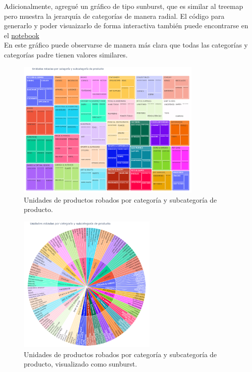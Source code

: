 Adicionalmente, agregué un gráfico de tipo sunburst, que es similar al treemap pero muestra la jerarquía de categorías de manera radial. El código para generarlo y poder visuaizarlo de forma interactiva también puede encontrarse en el \href{https://github.com/patricioibar/datos-tp1/blob/main/consultas_propias.ipynb}{notebook} \\
En este gráfico puede observarse de manera más clara que todas las categorías y categorías padre tienen valores similares.

\begin{figure}[H]
    \centering
    \includegraphics[width=0.8\textwidth]{imagenes/consultas_propias/treemap.png}
    \caption{Unidades de productos robados por categoría y subcategoría de producto.}
    \label{fig:robos_treemap}
\end{figure}

\begin{figure}[H]
    \centering
    \includegraphics[width=0.6\textwidth]{imagenes/consultas_propias/sunburst.png}
    \caption{Unidades de productos robados por categoría y subcategoría de producto, visualizado como sunburst.}
    \label{fig:robos_sunburst}
\end{figure}
